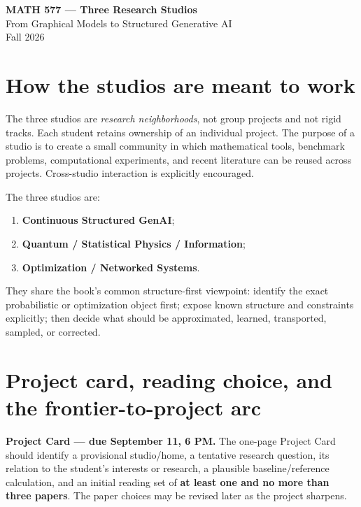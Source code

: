 \documentclass[11pt]{article}
\newcommand{\keybox}[1]{%
  \begin{center}
  \setlength{\fboxsep}{8pt}%
  \colorbox{UAlight}{\parbox{0.93\linewidth}{#1}}
  \end{center}}
\begin{document}
\begin{center}
{\LARGE\bfseries MATH 577 --- Three Research Studios}\\[1.5mm]
{\large From Graphical Models to Structured Generative AI}\\[1mm]
{\normalsize Fall 2026}\\[3mm]
\end{center}


\section*{How the studios are meant to work}

The three studios are \emph{research neighborhoods}, not group projects and not rigid tracks. Each student retains ownership of an individual project. The purpose of a studio is to create a small community in which mathematical tools, benchmark problems, computational experiments, and recent literature can be reused across projects. Cross-studio interaction is explicitly encouraged.

The three studios are:
\begin{enumerate}
    \item \textbf{Continuous Structured GenAI};
    \item \textbf{Quantum / Statistical Physics / Information};
    \item \textbf{Optimization / Networked Systems}.
\end{enumerate}

They share the book's common structure-first viewpoint: identify the exact probabilistic or optimization object first; expose known structure and constraints explicitly; then decide what should be approximated, learned, transported, sampled, or corrected.


\section*{Project card, reading choice, and the frontier-to-project arc}

\keybox{\textbf{Project Card --- due September 11, 6 PM.} The one-page Project Card should identify a provisional studio/home, a tentative research question, its relation to the student's interests or research, a plausible baseline/reference calculation, and an initial reading set of \textbf{at least one and no more than three papers}. The paper choices may be revised later as the project sharpens.}
\end{document}
